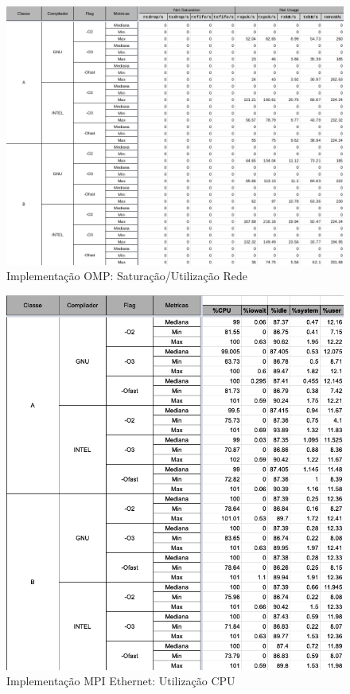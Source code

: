 \documentclass{article}
\begin{document}
\begin{appendices}
\begin{figure}[H]
    \centering
    \includegraphics[width=12cm]{Pictures/LUMZ_r641_OMP_NET.png}
    \caption{Implementação OMP: Saturação/Utilização Rede}
    \label{figure:LUMZ_r641_OMP_NET}
\end{figure}



\begin{figure}[H]
    \centering
    \includegraphics[width=12cm]{Pictures/LUMZ_r641_MPIE_CPU.png}
    \caption{Implementação MPI Ethernet: Utilização CPU}
    \label{figure:LUMZ_r641_MPIE_CPU}
\end{figure}


\end{appendices}
\end{document}
